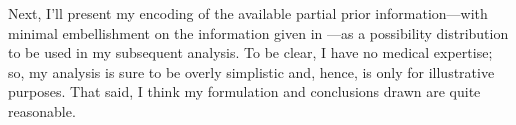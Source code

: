\documentclass[a4paper, 12pt]{article}
\theoremstyle{plain}
\theoremstyle{definition}
\theoremstyle{remark}
\begin{document}
Next, I'll present my encoding of the available partial prior information---with minimal embellishment on the information given in \citet{ware1989}---as a possibility distribution to be used in my subsequent analysis.  To be clear, I have no medical expertise; so, my analysis is sure to be overly simplistic and, hence, is only for illustrative purposes.  That said, I think my formulation and conclusions drawn are quite reasonable.  
\end{document}
